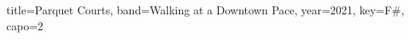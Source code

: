 \documentclass{skrul-leadsheet}
\begin{document}
\begin{song}[transpose-capo=true]{title={Parquet Courts}, band={Walking at a Downtown Pace}, year={2021}, key={F#}, capo={2}}



\end{song}
\end{document}
